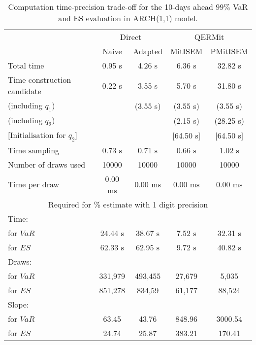 { \renewcommand{\arraystretch}{1.3} 
\begin{table}[h] 
\centering 
\caption{Computation time-precision trade-off for the 10-days ahead  $99\%$ VaR and ES evaluation in ARCH(1,1) model.} 
\label{tab:time_precision_arch} 
\begin{tabular}{lcccc}  
  & \multicolumn{2}{c}{Direct} & \multicolumn{2}{c}{QERMit}  \\ \cline{2-5} 
  & Naive & Adapted & MitISEM & PMitISEM  \\ \hline 
Total time & 0.95 s & 4.26 s & 6.36 s & 32.82 s \\ 
Time construction candidate & 0.22 s & 3.55 s & 5.70 s & 31.80 s \\ 
 (including $q_{1}$) &   &  (3.55 s) & (3.55 s) & (3.55 s) \\ 
 (including $q_{2}$) &   &  & (2.15 s) & (28.25 s) \\ 
$[$Initialisation for $q_{2}$$]$&   &   & $[$64.50 s$]$ & $[$64.50 s$]$ \\ 
Time sampling & 0.73 s & 0.71 s & 0.66 s & 1.02 s  \\  
Number of draws used & 10000 & 10000 & 10000 & 10000 \\ 
Time per draw & 0.00 ms & 0.00 ms & 0.00 ms & 0.00 ms \\ \hline 
\multicolumn{5}{c}{Required for \% estimate with 1 digit precision} \\ \hline 
Time: &  &  &   &  \\ 
\hspace{1cm} for $VaR$ & 24.44 s & 38.67 s & 7.52 s & 32.31 s \\ 
\hspace{1cm} for $ES$ & 62.33 s & 62.95 s & 9.72 s & 40.82 s \\ 
Draws: &  &  &   &  \\ 
\hspace{1cm} for $VaR$ & 331,979 & 493,455  & 27,679  & 5,035  \\ 
\hspace{1cm} for $ES$ & 851,278 & 834,59  & 61,177   & 88,524  \\ 
\hline 
Slope: &  &  &   &  \\ 
\hspace{1cm} for $VaR$ & 63.45 & 43.76  & 848.96  & 3000.54  \\ 
\hspace{1cm} for $ES$ & 24.74 & 25.87  & 383.21   & 170.41  \\  \hline 
\end{tabular} 
\end{table} 
} 
